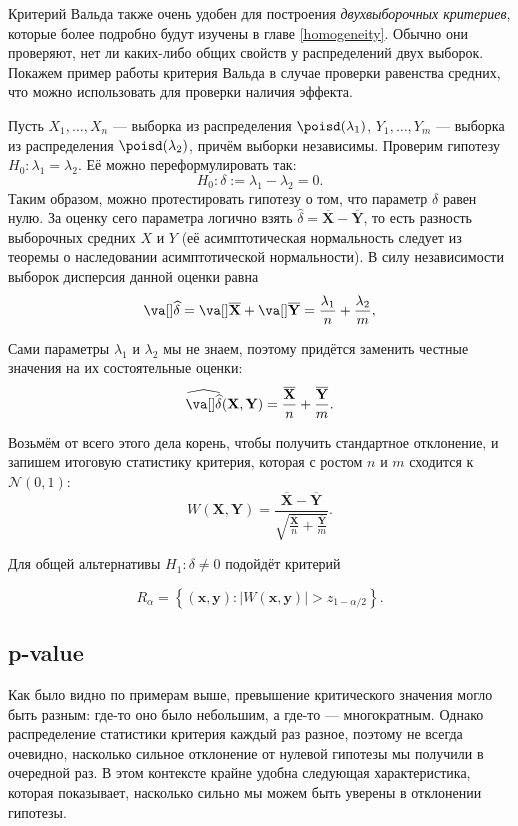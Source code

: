 Критерий Вальда также очень удобен для построения \textit{двухвыборочных критериев}, которые более подробно будут изучены в главе \ref{homogeneity}. Обычно они проверяют, нет ли каких-либо общих свойств у распределений двух выборок. Покажем пример работы критерия Вальда в случае проверки равенства средних, что можно использовать для проверки наличия эффекта.

\begin{example}
Пусть $X_1, \ldots , X_n$ --- выборка из распределения $\poisd(\lambda_1)$, $Y_1, \ldots, Y_m$ --- выборка из распределения $\poisd(\lambda_2)$, причём выборки независимы. Проверим гипотезу $H_0\colon \lambda_1 = \lambda_2$. Её можно переформулировать так:
\[
H_0\colon \delta := \lambda_1 - \lambda_2 = 0.
\]
Таким образом, можно протестировать гипотезу о том, что параметр $\delta$ равен нулю. За оценку сего параметра логично взять $\widehat{\delta} = \overline{\mathbf X} - \overline{\mathbf Y}$, то есть разность выборочных средних $X$ и $Y$ (её асимптотическая нормальность следует из теоремы о наследовании асимптотической нормальности). В силу независимости выборок дисперсия данной оценки равна
	\[
    \va[]\widehat{\delta} = \va[]\overline{\mathbf X} + \va[]\overline{\mathbf Y} = \frac{\lambda_1}{n} + \frac{\lambda_2}{m},
    \]

Сами параметры $\lambda_1$ и $\lambda_2$ мы не знаем, поэтому придётся заменить честные значения на их состоятельные оценки:
\[
\widehat{\va[]\widehat{\delta}}(\mathbf X, \mathbf Y) = \frac{\overline{\mathbf X}}{n} + \frac{\overline{\mathbf Y}}{m}.
\]

Возьмём от всего этого дела корень, чтобы получить стандартное отклонение, и запишем итоговую статистику критерия, которая с ростом $n$ и $m$ сходится к $\mathcal{N}(0, 1)$:
\[
W(\mathbf X, \mathbf Y) = \frac{\overline{\mathbf{X}} - \overline{\mathbf{Y}}}{\sqrt{\frac{\overline{\mathbf X}}{n} + \frac{\overline{\mathbf Y}}{m}}}.
\]

Для общей альтернативы $H_1\colon \delta \ne 0$ подойдёт критерий

\[
R_{\alpha} = \left\{(\mathbf{x}, \mathbf{y})\colon \left|W(\mathbf x, \mathbf y)\right| > z_{1-\alpha/2}\right\}.
\]
\end{example}

\subsection{p-value}

Как было видно по примерам выше, превышение критического значения могло быть разным: где-то оно было небольшим, а где-то --- многократным. Однако распределение статистики критерия каждый раз разное, поэтому не всегда очевидно, насколько сильное отклонение от нулевой гипотезы мы получили в очередной раз. В этом контексте крайне удобна следующая характеристика, которая показывает, насколько сильно мы можем быть уверены в отклонении гипотезы.

